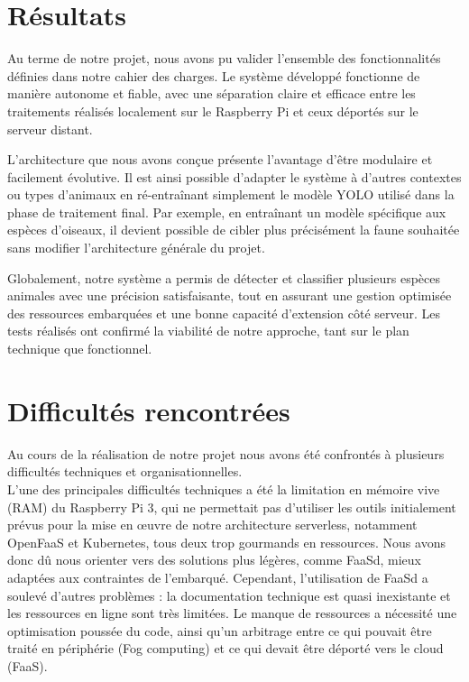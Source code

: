 \documentclass[a4paper,11pt]{article}
\begin{document}
	\section{Résultats}
	Au terme de notre projet, nous avons pu valider l’ensemble des fonctionnalités définies dans notre cahier des charges. Le système développé fonctionne de manière autonome et fiable, avec une séparation claire et efficace entre les traitements réalisés localement sur le Raspberry Pi et ceux déportés sur le serveur distant.
	
	L’architecture que nous avons conçue présente l’avantage d’être modulaire et facilement évolutive. Il est ainsi possible d’adapter le système à d’autres contextes ou types d’animaux en ré-entraînant simplement le modèle YOLO utilisé dans la phase de traitement final. Par exemple, en entraînant un modèle spécifique aux espèces d’oiseaux, il devient possible de cibler plus précisément la faune souhaitée sans modifier l’architecture générale du projet.
	
	Globalement, notre système a permis de détecter et classifier plusieurs espèces animales avec une précision satisfaisante, tout en assurant une gestion optimisée des ressources embarquées et une bonne capacité d’extension côté serveur. Les tests réalisés ont confirmé la viabilité de notre approche, tant sur le plan technique que fonctionnel.


	\section{Difficultés rencontrées}
	Au cours de la réalisation de notre projet nous avons été confrontés à plusieurs difficultés techniques et organisationnelles.\\
	
	L'une des principales difficultés techniques a été la limitation en mémoire vive (RAM) du Raspberry Pi 3, qui ne permettait pas d'utiliser les outils initialement prévus pour la mise en œuvre de notre architecture serverless, notamment OpenFaaS et Kubernetes, tous deux trop gourmands en ressources. Nous avons donc dû nous orienter vers des solutions plus légères, comme FaaSd, mieux adaptées aux contraintes de l’embarqué. Cependant, l’utilisation de FaaSd a soulevé d'autres problèmes : la documentation technique est quasi inexistante et les ressources en ligne sont très limitées. Le manque de ressources a nécessité une optimisation poussée du code, ainsi qu’un arbitrage entre ce qui pouvait être traité en périphérie (Fog computing) et ce qui devait être déporté vers le cloud (FaaS).\\
	
\end{document}
